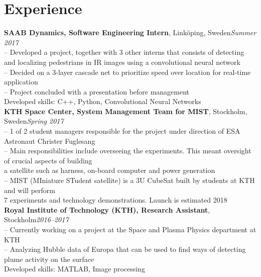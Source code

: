 \documentclass[10pt]{article}
\begin{document}
\section*{Experience}
\vspace{0.2em}
\hline
\vspace{0.5em}
\noindent\textbf{SAAB Dynamics, Software Engineering Intern}, Linköping, Sweden\hfill\textit{Summer 2017}\\
\indent-- Developed a project, together with 3 other interns that consists of detecting and localizing pedestrians in IR images using a convolutional neural network\\
\indent-- Decided on a 3-layer cascade net to prioritize speed over location for real-time application\\
\indent-- Project concluded with a presentation before management\\
\indent Developed skills: C++, Python, Convolutional Neural Networks\\

\noindent\textbf{KTH Space Center, System Management Team for MIST}, Stockholm, Sweden\hfill\textit{Spring 2017}\\
\indent-- 1 of 2 student managers responsible for the project under direction of ESA Astronaut Christer Fuglesang\\
\indent-- Main responsibilities include overseeing the experiments. This meant oversight of crucial aspects of building \\\indent\hspace{0.2cm}a satellite such as harness, on-board computer and power generation\\
\indent-- MIST (MIniature STudent satellite) is a 3U CubeSat built by students at KTH and will perform\\\indent\hspace{0.2cm} 7 experiments and technology demonstrations. Launch is estimated 2018\\

\noindent\textbf{Royal Institute of Technology (KTH), Research Assistant}, Stockholm\hfill\textit{2016--2017}\\
\indent-- Currently working on a project at the Space and Plasma Physics department at KTH\\
\indent-- Analyzing Hubble data of Europa that can be used to find ways of detecting plume activity on the surface\\
\indent Developed skills: MATLAB, Image processing\\
\end{document}
